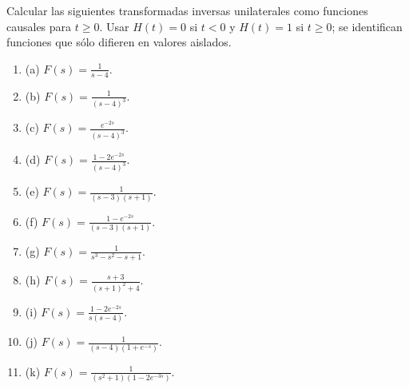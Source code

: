 Calcular las siguientes transformadas inversas unilaterales como funciones causales para \(t\ge0\). Usar \(H(t)=0\) si \(t<0\) y \(H(t)=1\) si \(t\ge0\); se identifican funciones que sólo difieren en valores aislados.

\begin{enumerate}[label=(\alph*),ref=\alph*,leftmargin=*]
\item (a) \(F(s)=\frac1{s-4}\).
\item (b) \(F(s)=\frac1{(s-4)^3}\).
\item (c) \(F(s)=\frac{e^{-2s}}{(s-4)^3}\).
\item (d) \(F(s)=\frac{1-2e^{-2s}}{(s-4)^3}\).
\item (e) \(F(s)=\frac1{(s-3)(s+1)}\).
\item (f) \(F(s)=\frac{1-e^{-2s}}{(s-3)(s+1)}\).
\item (g) \(F(s)=\frac1{s^3-s^2-s+1}\).
\item (h) \(F(s)=\frac{s+3}{(s+1)^2+4}\).
\item (i) \(F(s)=\frac{1-2e^{-2s}}{s(s-4)}\).
\item (j) \(F(s)=\frac1{(s-4)(1+e^{-s})}\).
\item (k) \(F(s)=\frac1{(s^2+1)(1-2e^{-3s})}\).
\end{enumerate}
